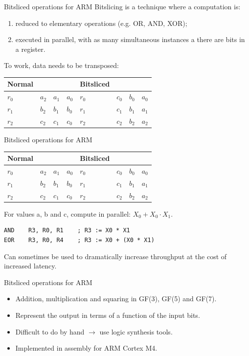 \documentclass{beamer}
\begin{document}
\begin{frame}{Bitsliced operations for ARM}
Bitslicing is a technique where a computation is:
\begin{enumerate}
    \item reduced to elementary operations (e.g. OR, AND, XOR);
    \item executed in parallel, with as many simultaneous instances a there are bits in a register.
\end{enumerate}
To work, data needs to be transposed:
\begin{table}[]
\begin{tabular}{llll || llll}
Normal & & & & Bitsliced & & & \\ \hline
$r_0$ & $a_2$ & $a_1$ & $a_0$ & $r_0$ & $c_0$ & $b_0$ & $a_0$ \\ \hline
$r_1$ & $b_2$ & $b_1$ & $b_0$ & $r_1$ & $c_1$ & $b_1$ & $a_1$ \\ \hline
$r_2$ & $c_2$ & $c_1$ & $c_0$ & $r_2$ & $c_2$ & $b_2$ & $a_2$ \\ \hline
\end{tabular}
\end{table}
\end{frame}

\begin{frame}[fragile=singleslide]{Bitsliced operations for ARM}
\begin{table}[]
\begin{tabular}{llll || llll}
Normal & & & & Bitsliced & & & \\ \hline
$r_0$ & $a_2$ & $a_1$ & $a_0$ & $r_0$ & $c_0$ & $b_0$ & $a_0$ \\ \hline
$r_1$ & $b_2$ & $b_1$ & $b_0$ & $r_1$ & $c_1$ & $b_1$ & $a_1$ \\ \hline
$r_2$ & $c_2$ & $c_1$ & $c_0$ & $r_2$ & $c_2$ & $b_2$ & $a_2$ \\ \hline
\end{tabular}
\end{table}

For values a, b and c, compute in parallel: $X_0 + X_0 \cdot X_1$. 
\begin{verbatim}
AND    R3, R0, R1    ; R3 := X0 * X1
EOR    R3, R0, R4    ; R3 := X0 + (X0 * X1)
\end{verbatim}
Can sometimes be used to dramatically increase throughput at the cost of increased latency.
\end{frame}

\begin{frame}{Bitsliced operations for ARM}
\begin{itemize}
    \item Addition, multiplication and squaring in GF(3), GF(5) and GF(7).
    \item Represent the output in terms of a function of the input bits.
    \item Difficult to do by hand $\rightarrow$ use logic synthesis tools.
    \item Implemented in assembly for ARM Cortex M4.
\end{itemize}
\end{frame}
\end{document}
